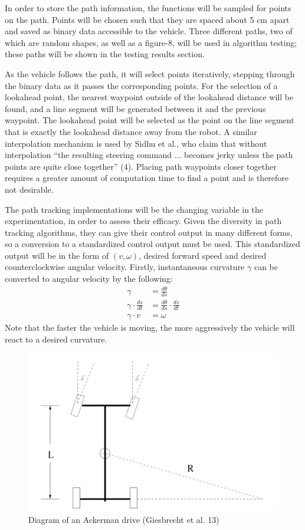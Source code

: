 \documentclass[mla7]{mla}
\begin{document}
\begin{paper}
In order to store the path information, the functions will be sampled for points on the path. Points will be chosen such that they are spaced about 5 cm apart and saved as binary data accessible to the vehicle. Three different paths, two of which are random shapes, as well as a figure-8, will be used in algorithm testing; these paths will be shown in the testing results section.

As the vehicle follows the path, it will select points iteratively, stepping through the binary data as it passes the corresponding points. For the selection of a lookahead point, the nearest waypoint outside of the lookahead distance will be found, and a line segment will be generated between it and the previous waypoint. The lookahead point will be selected as the point on the line segment that is exactly the lookahead distance away from the robot. A similar interpolation mechanism is used by Sidhu et al., who claim that without interpolation ``the resulting steering command ... becomes jerky unless the path points are quite close together'' (4). Placing path waypoints closer together requires a greater amount of computation time to find a point and is therefore not desirable. 

The path tracking implementations will be the changing variable in the experimentation, in order to assess their efficacy. Given the diversity in path tracking algorithms, they can give their control output in many different forms, so a conversion to a standardized control output must be used. This standardized output will be in the form of $(v,\omega)$, desired forward speed and desired counterclockwise angular velocity. Firstly, instantaneous curvature $\gamma$ can be converted to angular velocity by the following:
\begin{subequations}
\begin{align}
\gamma &= \frac{d\theta}{ds} \\
\gamma \cdot \frac{ds}{dt} &= \frac{d\theta}{ds} \cdot \frac{ds}{dt} \\
\gamma \cdot v &= \omega \label{eqn:gamma2omega}
\end{align}
\end{subequations}
Note that the faster the vehicle is moving, the more aggressively the vehicle will react to a desired curvature.

\begin{figure}[H]
\includegraphics[width=0.6\linewidth]{GiesbrechtAckermanDiagram}
\captionsetup{justification=centering}
\caption{Diagram of an Ackerman drive (Giesbrecht et al. 13)}
\label{img:ackerman1}
\end{figure}


\end{paper}
\end{document}
